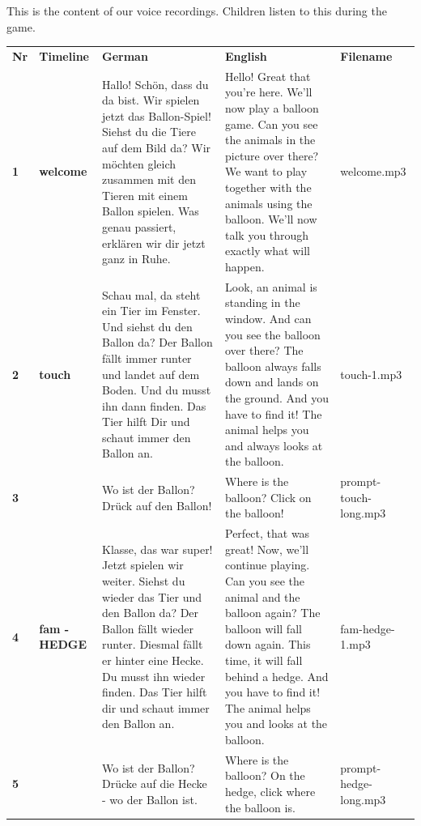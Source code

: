 \documentclass[
  man,floatsintext]{apa6}
\begin{document}
This is the content of our voice recordings. Children listen to this during the game.

\begin{longtable}[]{@{}
  >{\raggedright\arraybackslash}p{}
  >{\raggedright\arraybackslash}p{}
  >{\raggedright\arraybackslash}p{}
  >{\raggedright\arraybackslash}p{}
  >{\raggedright\arraybackslash}p{}@{}}
\toprule
\endhead
\textbf{Nr} & \textbf{Timeline} & \textbf{German} & \textbf{English} & \textbf{Filename} \\
\textbf{1} & \textbf{welcome} & Hallo! Schön, dass du da bist. Wir spielen jetzt das Ballon-Spiel! Siehst du die Tiere auf dem Bild da? Wir möchten gleich zusammen mit den Tieren mit einem Ballon spielen. Was genau passiert, erklären wir dir jetzt ganz in Ruhe. & Hello! Great that you're here. We'll now play a balloon game. Can you see the animals in the picture over there? We want to play together with the animals using the balloon. We'll now talk you through exactly what will happen. & welcome.mp3 \\
\textbf{2} & \textbf{touch} & Schau mal, da steht ein Tier im Fenster. Und siehst du den Ballon da? Der Ballon fällt immer runter und landet auf dem Boden. Und du musst ihn dann finden. Das Tier hilft Dir und schaut immer den Ballon an. & Look, an animal is standing in the window. And can you see the balloon over there? The balloon always falls down and lands on the ground. And you have to find it! The animal helps you and always looks at the balloon. & touch-1.mp3 \\
\textbf{3} & & Wo ist der Ballon? Drück auf den Ballon! & Where is the balloon? Click on the balloon! & prompt-touch-long.mp3 \\
\textbf{4} & \textbf{fam - HEDGE} & Klasse, das war super! Jetzt spielen wir weiter. Siehst du wieder das Tier und den Ballon da? Der Ballon fällt wieder runter. Diesmal fällt er hinter eine Hecke. Du musst ihn wieder finden. Das Tier hilft dir und schaut immer den Ballon an. & Perfect, that was great! Now, we'll continue playing. Can you see the animal and the balloon again? The balloon will fall down again. This time, it will fall behind a hedge. And you have to find it! The animal helps you and looks at the balloon. & fam-hedge-1.mp3 \\
\textbf{5} & & Wo ist der Ballon? Drücke auf die Hecke - wo der Ballon ist. & Where is the balloon? On the hedge, click where the balloon is. & prompt-hedge-long.mp3 \\

\end{longtable}
\end{document}
